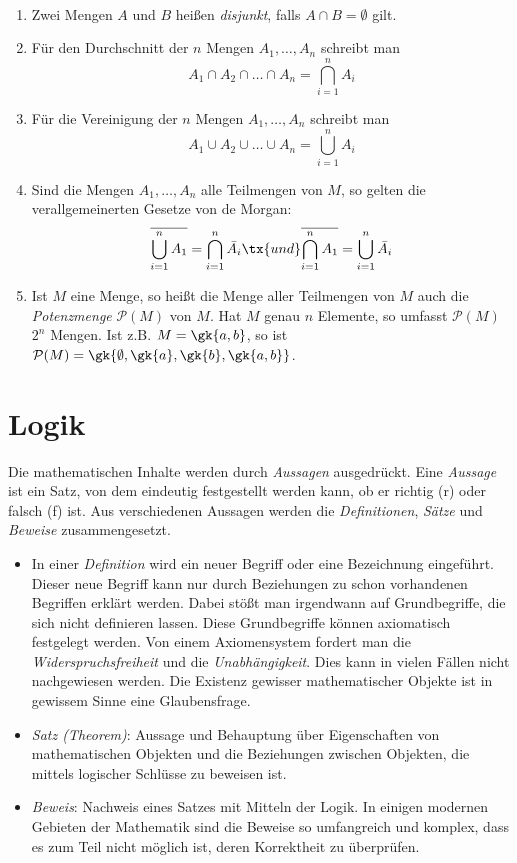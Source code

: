 \begin{note}~
\begin{enumerate}
\item Zwei Mengen $A$ und $B$ heißen \emph{disjunkt}, falls $A \cap B = \emptyset$ gilt.
\item Für den Durchschnitt der $n$ Mengen $A_1, \dots, A_n$ schreibt man \[A_1 \cap A_2 \cap \dots \cap A_n = \bigcap_{i = 1}^{n} A_i\]
\item Für die Vereinigung der $n$ Mengen $A_1, \dots, A_n$ schreibt man \[A_1 \cup A_2 \cup \dots \cup A_n = \bigcup_{i = 1}^{n} A_i\]
\item Sind die Mengen $A_1, \dots, A_n$ alle Teilmengen von $M$, so gelten die verallgemeinerten Gesetze von de Morgan:
	\[\overline{\bigcup_{i = 1}^{n} A_1} = \bigcap_{i = 1}^{n} \bar{A_i}
	\tx{ und }
	\overline{\bigcap_{i = 1}^{n} A_1} = \bigcup_{i = 1}^{n} \bar{A_i}\]

\item Ist $M$ eine Menge, so heißt die Menge aller Teilmengen von $M$ auch die \emph{Potenzmenge} $\mathcal{P}(M)$ von $M$. Hat $M$ genau $n$ Elemente, so umfasst $\mathcal{P}(M)$ $2^n$ Mengen. Ist \ac{z.B.} $M = \gk{a, b}$, so ist $\mathcal{P}(M) = \gk{\emptyset, \gk{a}, \gk{b}, \gk{a, b}}$.
\end{enumerate}
\end{note}

\section{Logik}
Die mathematischen Inhalte werden durch \emph{Aussagen} ausgedrückt. Eine \emph{Aussage} ist ein Satz, von dem eindeutig festgestellt werden kann, ob er richtig (r) oder falsch (f) ist. Aus verschiedenen Aussagen werden die \emph{Definitionen}, \emph{Sätze} und \emph{Beweise} zusammengesetzt.
\begin{itemize}
\item In einer \emph{Definition} wird ein neuer Begriff oder eine Bezeichnung eingeführt. Dieser neue Begriff kann nur durch Beziehungen zu schon vorhandenen Begriffen erklärt werden. Dabei stößt man irgendwann auf Grundbegriffe, die sich nicht definieren lassen. Diese Grundbegriffe können axiomatisch festgelegt werden. Von einem Axiomensystem fordert man die \emph{Widerspruchsfreiheit} und die \emph{Unabhängigkeit}. Dies kann in vielen Fällen nicht nachgewiesen werden. Die Existenz gewisser mathematischer Objekte ist in gewissem Sinne eine Glaubensfrage.
\item \emph{Satz (Theorem)}: Aussage und Behauptung über Eigenschaften von mathematischen Objekten und die Beziehungen zwischen Objekten, die mittels logischer Schlüsse zu beweisen ist.
\item \emph{Beweis}: Nachweis eines Satzes mit Mitteln der Logik. In einigen modernen Gebieten der Mathematik sind die Beweise so umfangreich und komplex, dass es zum Teil nicht möglich ist, deren Korrektheit zu überprüfen.
\end{itemize}

